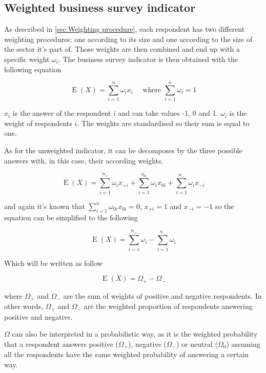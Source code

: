 \documentclass[12pt,a4paper,oneside]{book}
\DeclareMathOperator{\E}{E}
\begin{document}
\subsection{Weighted business survey indicator}

As described in \autoref{sec:Weighting procedure}, each respondent has two different weighting procedures: one according to its size and one according to the size of the sector it's part of. Those weights are then combined and end up with a specific weight $\omega_i$.
The business survey indicator is then obtained with the following equation 

\begin{equation}
    \E(X) = \sum_{i=1}^n \omega_i x_i  \quad \text{  where  } \sum_{i=1}^n \omega_i =  1
\end{equation} 

$x_i$ is the answer of the respondent $i$ and can take values -1, 0 and 1.
$\omega_i$ is the weight of respondents $i$. 
The weights are standardised so their sum is equal to one.

As for the unweighted indicator, it can be decomposes by the three possible answers with, in this case, their according weights.

\begin{equation}
    \E(X) = \sum_{i=1}^{n_+} \omega_{i} x_{+i} + \sum_{i=1}^{n_0} \omega_{i} x_{0i} + \sum_{i=1}^{n_-} \omega_{i} x_{-i}
 \end{equation}

and again it's known that $\sum_{i=1}^n \omega_{0i} x_{0i} = 0$, $x_{+i} = 1$ and $x_{-i}=-1$ so the equation can be simplified to the following

\begin{equation}
    \E(X) = \sum_{i=1}^{n_+} \omega_{i}  - \sum_{i=1}^{n_-} \omega_{i}
\end{equation}

Which will be written as follow

\begin{equation}
    \E(X) = \Omega_+ - \Omega_- \label{eq: BSI Weighted}
\end{equation}

where $\Omega_+$ and $\Omega_-$ are the sum of weights of positive and negative respondents. 
In other words, $\Omega_+$ and $\Omega_-$ are the weighted proportion of respondents answering positive and negative. 

$\Omega$ can also be interpreted in a probabilistic way, as it is the weighted probability that a respondent answers positive ($\Omega_+$), negative ($\Omega_-$) or neutral ($\Omega_0$) assuming all the respondents have the same weighted probability of answering a certain way.
\end{document}
